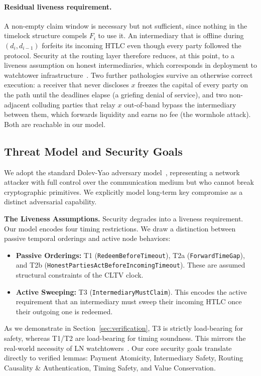 \documentclass[sigconf,review]{acmart}
\theoremstyle{acmdefinition}
\begin{document}
\paragraph{Residual liveness requirement.}
A non-empty claim window is necessary but not sufficient, since nothing in the timelock structure compels $F_i$ to use it. An intermediary that is offline during $(d_i, d_{i-1})$ forfeits its incoming HTLC even though every party followed the protocol. Security at the routing layer therefore reduces, at this point, to a liveness assumption on honest intermediaries, which corresponds in deployment to watchtower infrastructure~\cite{mccorry2019pisa}. Two further pathologies survive an otherwise correct execution: a receiver that never discloses $x$ freezes the capital of every party on the path until the deadlines elapse (a griefing denial of service), and two non-adjacent colluding parties that relay $x$ out-of-band bypass the intermediary between them, which forwards liquidity and earns no fee (the wormhole attack). Both are reachable in our model.

\subsection{Threat Model and Security Goals}
We adopt the standard Dolev-Yao adversary model~\cite{dolev1983security}, representing a network attacker with full control over the communication medium but who cannot break cryptographic primitives. We explicitly model long-term key compromise as a distinct adversarial capability.

\textbf{The Liveness Assumptions.} Security degrades into a liveness requirement. Our model encodes four timing restrictions. We draw a distinction between passive temporal orderings and active node behaviors:
\begin{itemize}
    \item \textbf{Passive Orderings:} T1 (\texttt{RedeemBeforeTimeout}), T2a (\texttt{ForwardTimeGap}), and T2b (\texttt{HonestPartiesActBefore\-IncomingTimeout}). These are assumed structural constraints of the CLTV clock.
    \item \textbf{Active Sweeping:} T3 (\texttt{IntermediaryMustClaim}). This encodes the active requirement that an intermediary must sweep their incoming HTLC once their outgoing one is redeemed.
\end{itemize}
As we demonstrate in Section~\ref{sec:verification}, T3 is strictly load-bearing for safety, whereas T1/T2 are load-bearing for timing soundness. This mirrors the real-world necessity of LN watchtowers~\cite{mccorry2019pisa}. Our core security goals translate directly to verified lemmas: Payment Atomicity, Intermediary Safety, Routing Causality \& Authentication, Timing Safety, and Value Conservation.
\end{document}
